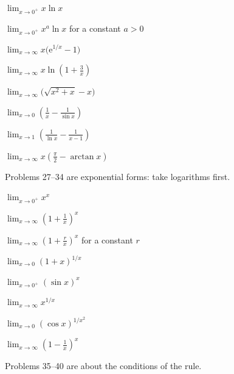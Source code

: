 \begin{problems}[resume]
  \item $\displaystyle\lim_{x\to0^{+}}x\ln x$
  \item $\displaystyle\lim_{x\to0^{+}}x^{a}\ln x$ \;for a constant $a>0$
  \item $\displaystyle\lim_{x\to\infty}x\bigl(\mathrm{e}^{1/x}-1\bigr)$
  \item $\displaystyle\lim_{x\to\infty}x\ln\!\left(1+\frac{3}{x}\right)$
  \item $\displaystyle\lim_{x\to\infty}\bigl(\sqrt{x^{2}+x}-x\bigr)$
  \item $\displaystyle\lim_{x\to0}\left(\frac{1}{x}-\frac{1}{\sin x}\right)$
  \item $\displaystyle\lim_{x\to1}
        \left(\frac{1}{\ln x}-\frac{1}{x-1}\right)$
  \item $\displaystyle\lim_{x\to\infty}
        x\left(\frac{\pi}{2}-\arctan x\right)$
\end{problems}

Problems 27--34 are exponential forms: take logarithms first.

\begin{problems}[resume]
  \item $\displaystyle\lim_{x\to0^{+}}x^{x}$
  \item $\displaystyle\lim_{x\to\infty}\left(1+\frac{1}{x}\right)^{x}$
  \item $\displaystyle\lim_{x\to\infty}\left(1+\frac{r}{x}\right)^{x}$
        \;for a constant $r$
  \item $\displaystyle\lim_{x\to0}(1+x)^{1/x}$
  \item $\displaystyle\lim_{x\to0^{+}}(\sin x)^{x}$
  \item $\displaystyle\lim_{x\to\infty}x^{1/x}$
  \item $\displaystyle\lim_{x\to0}(\cos x)^{1/x^{2}}$
  \item $\displaystyle\lim_{x\to\infty}\left(1-\frac{1}{x}\right)^{x}$
\end{problems}

Problems 35--40 are about the conditions of the rule.


